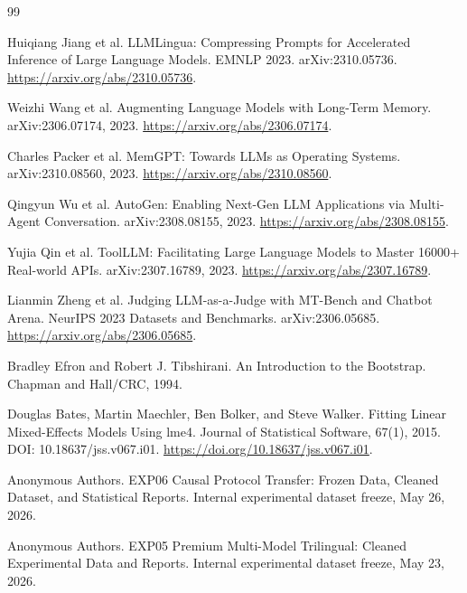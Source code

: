 \documentclass[11pt]{article}
\begin{document}
\begin{thebibliography}{99}

Huiqiang Jiang et al.
\newblock LLMLingua: Compressing Prompts for Accelerated Inference of Large Language Models.
\newblock EMNLP 2023. arXiv:2310.05736.
\newblock \url{https://arxiv.org/abs/2310.05736}.

Weizhi Wang et al.
\newblock Augmenting Language Models with Long-Term Memory.
\newblock arXiv:2306.07174, 2023.
\newblock \url{https://arxiv.org/abs/2306.07174}.

Charles Packer et al.
\newblock MemGPT: Towards LLMs as Operating Systems.
\newblock arXiv:2310.08560, 2023.
\newblock \url{https://arxiv.org/abs/2310.08560}.

Qingyun Wu et al.
\newblock AutoGen: Enabling Next-Gen LLM Applications via Multi-Agent Conversation.
\newblock arXiv:2308.08155, 2023.
\newblock \url{https://arxiv.org/abs/2308.08155}.

Yujia Qin et al.
\newblock ToolLLM: Facilitating Large Language Models to Master 16000+ Real-world APIs.
\newblock arXiv:2307.16789, 2023.
\newblock \url{https://arxiv.org/abs/2307.16789}.

Lianmin Zheng et al.
\newblock Judging LLM-as-a-Judge with MT-Bench and Chatbot Arena.
\newblock NeurIPS 2023 Datasets and Benchmarks. arXiv:2306.05685.
\newblock \url{https://arxiv.org/abs/2306.05685}.

Bradley Efron and Robert J. Tibshirani.
\newblock An Introduction to the Bootstrap.
\newblock Chapman and Hall/CRC, 1994.

Douglas Bates, Martin Maechler, Ben Bolker, and Steve Walker.
\newblock Fitting Linear Mixed-Effects Models Using lme4.
\newblock Journal of Statistical Software, 67(1), 2015.
\newblock DOI: 10.18637/jss.v067.i01.
\newblock \url{https://doi.org/10.18637/jss.v067.i01}.

Anonymous Authors.
\newblock EXP06 Causal Protocol Transfer: Frozen Data, Cleaned Dataset, and Statistical Reports.
\newblock Internal experimental dataset freeze, May 26, 2026.

Anonymous Authors.
\newblock EXP05 Premium Multi-Model Trilingual: Cleaned Experimental Data and Reports.
\newblock Internal experimental dataset freeze, May 23, 2026.


\end{thebibliography}
\end{document}

